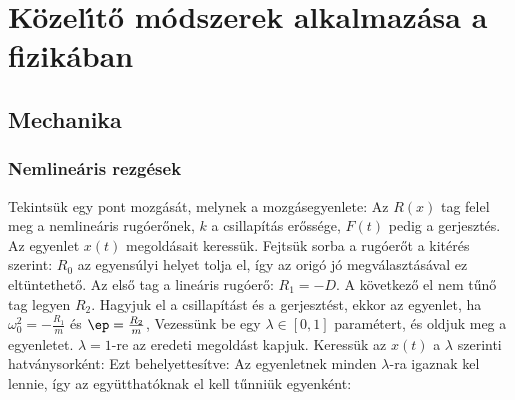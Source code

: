 \chapter{K\"ozel{\'\i}t\H{o} m\'odszerek alkalmaz\'asa a fizik\'aban}
 
 \section{Mechanika} 
  
  \subsection{Nemlineáris rezgések}
   
   Tekintsük egy pont mozgását, melynek a mozgásegyenlete: 
   Az $R(x)$ tag felel meg a nemlineáris rugóerőnek, $k$ a  csillapítás erőssége, $F(t)$ pedig a gerjesztés.
   Az egyenlet $x(t)$ megoldásait keressük.
   Fejtsük sorba a rugóerőt a kitérés szerint:
   $R_0$ az egyensúlyi helyet tolja el, így az origó jó megválasztásával ez eltüntethető.
   Az első tag a lineáris rugóerő: $R_1=-D$.
   A következő el nem tűnő tag legyen $R_2$.
   Hagyjuk el a csillapítást és a gerjesztést, ekkor az egyenlet, ha $\omega_0^2=-\frac{R_1}{m}$ és $\ep=\frac{R_2}{m}$,
   Vezessünk be egy $\lambda\in[0,1]$ paramétert, és oldjuk meg a 
   egyenletet. $\lambda=1$-re az eredeti megoldást kapjuk.
   Keressük az $x(t)$ a $\lambda$ szerinti hatványsorként:
   Ezt behelyettesítve:
   Az egyenletnek minden $\lambda$-ra igaznak kel lennie, így az együtthatóknak el kell tűnniük egyenként:
